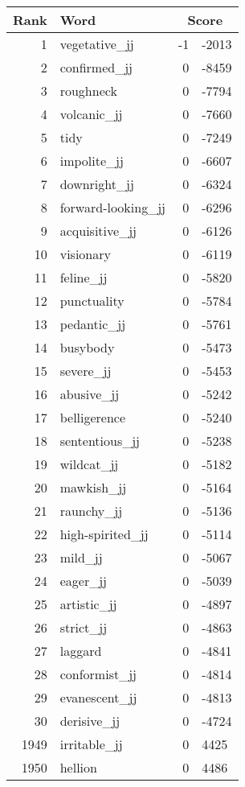 \begin{longtable}[!htbp]{| rlr@{.}l |}
    \hline
    \textbf{Rank} & \textbf{Word} & \multicolumn{2}{c|}{\textbf{Score}} \\
    \hline
    \endhead
    1 & vegetative\_jj & -1 & -2013 \\
    2 & confirmed\_jj & 0 & -8459 \\
    3 & roughneck & 0 & -7794 \\
    4 & volcanic\_jj & 0 & -7660 \\
    5 & tidy & 0 & -7249 \\
    6 & impolite\_jj & 0 & -6607 \\
    7 & downright\_jj & 0 & -6324 \\
    8 & forward-looking\_jj & 0 & -6296 \\
    9 & acquisitive\_jj & 0 & -6126 \\
    10 & visionary & 0 & -6119 \\
    11 & feline\_jj & 0 & -5820 \\
    12 & punctuality & 0 & -5784 \\
    13 & pedantic\_jj & 0 & -5761 \\
    14 & busybody & 0 & -5473 \\
    15 & severe\_jj & 0 & -5453 \\
    16 & abusive\_jj & 0 & -5242 \\
    17 & belligerence & 0 & -5240 \\
    18 & sententious\_jj & 0 & -5238 \\
    19 & wildcat\_jj & 0 & -5182 \\
    20 & mawkish\_jj & 0 & -5164 \\
    21 & raunchy\_jj & 0 & -5136 \\
    22 & high-spirited\_jj & 0 & -5114 \\
    23 & mild\_jj & 0 & -5067 \\
    24 & eager\_jj & 0 & -5039 \\
    25 & artistic\_jj & 0 & -4897 \\
    26 & strict\_jj & 0 & -4863 \\
    27 & laggard & 0 & -4841 \\
    28 & conformist\_jj & 0 & -4814 \\
    29 & evanescent\_jj & 0 & -4813 \\
    30 & derisive\_jj & 0 & -4724 \\
    1949 & irritable\_jj & 0 & 4425 \\
    1950 & hellion & 0 & 4486 \\

\end{longtable}
